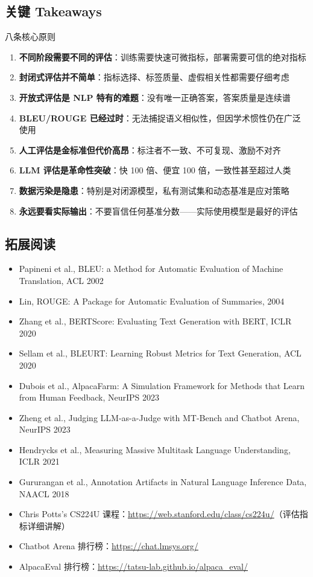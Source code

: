 \subsection{关键 Takeaways}

\begin{importantbox}{八条核心原则}
\begin{enumerate}
    \item \textbf{不同阶段需要不同的评估}：训练需要快速可微指标，部署需要可信的绝对指标
    \item \textbf{封闭式评估并不简单}：指标选择、标签质量、虚假相关性都需要仔细考虑
    \item \textbf{开放式评估是 NLP 特有的难题}：没有唯一正确答案，答案质量是连续谱
    \item \textbf{BLEU/ROUGE 已经过时}：无法捕捉语义相似性，但因学术惯性仍在广泛使用
    \item \textbf{人工评估是金标准但代价高昂}：标注者不一致、不可复现、激励不对齐
    \item \textbf{LLM 评估是革命性突破}：快 100 倍、便宜 100 倍，一致性甚至超过人类
    \item \textbf{数据污染是隐患}：特别是对闭源模型，私有测试集和动态基准是应对策略
    \item \textbf{永远要看实际输出}：不要盲信任何基准分数——实际使用模型是最好的评估
\end{enumerate}
\end{importantbox}

\subsection{拓展阅读}

\begin{itemize}
    \item Papineni et al., BLEU: a Method for Automatic Evaluation of Machine Translation, ACL 2002
    \item Lin, ROUGE: A Package for Automatic Evaluation of Summaries, 2004
    \item Zhang et al., BERTScore: Evaluating Text Generation with BERT, ICLR 2020
    \item Sellam et al., BLEURT: Learning Robust Metrics for Text Generation, ACL 2020
    \item Dubois et al., AlpacaFarm: A Simulation Framework for Methods that Learn from Human Feedback, NeurIPS 2023
    \item Zheng et al., Judging LLM-as-a-Judge with MT-Bench and Chatbot Arena, NeurIPS 2023
    \item Hendrycks et al., Measuring Massive Multitask Language Understanding, ICLR 2021
    \item Gururangan et al., Annotation Artifacts in Natural Language Inference Data, NAACL 2018
    \item Chris Potts's CS224U 课程：\url{https://web.stanford.edu/class/cs224u/}（评估指标详细讲解）
    \item Chatbot Arena 排行榜：\url{https://chat.lmsys.org/}
    \item AlpacaEval 排行榜：\url{https://tatsu-lab.github.io/alpaca_eval/}
\end{itemize}


